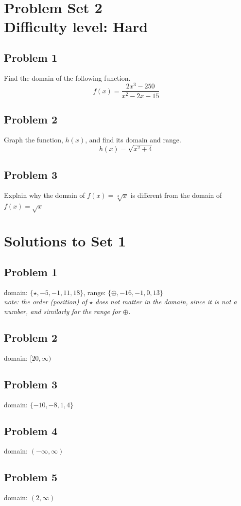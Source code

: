 \documentclass[12pt]{article}
\begin{document}
\section*{Problem Set 2\\Difficulty level: Hard}
\subsection*{Problem 1}
Find the domain of the following function.
\[f(x)=\dfrac{2x^3-250}{x^2-2x-15}\]

\subsection*{Problem 2}
Graph the function, \(h(x)\), and find its domain and range.
\[h(x)=\sqrt{x^2+4}\]

\subsection*{Problem 3}
Explain why the domain of \(f(x)=\sqrt[3]{x}\) is different from the domain of \(f(x)=\sqrt{x}\)

\newpage
\section*{Solutions to Set 1}
\subsection*{Problem 1}
domain: \(\{\star,-5,-1,11,18\}\), range: \(\{\oplus,-16,-1,0,13\}\)\\
\textit{note: the order (position) of \(\star\) does not matter in the domain, since it is not a number, and similarly for the range for \(\oplus\).}
\subsection*{Problem 2}
domain: \([20,\infty)\)
\subsection*{Problem 3}
domain: \(\{-10,-8,1,4\}\)
\subsection*{Problem 4}
domain: \((-\infty,\infty)\)
\subsection*{Problem 5}
domain: \((2,\infty)\)
\end{document}
